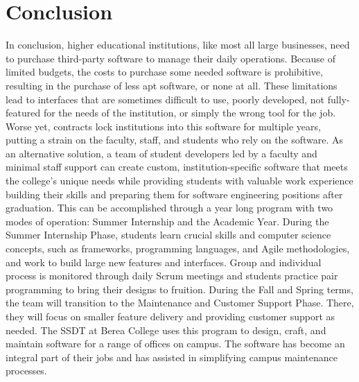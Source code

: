 \section{Conclusion}
In conclusion, higher educational institutions, like most all large businesses, need to purchase third-party software to manage their daily operations. Because of limited budgets, the costs to purchase some needed software is prohibitive, resulting in the purchase of less apt software, or none at all. These limitations lead to interfaces that are sometimes difficult to use, poorly developed, not fully-featured for the needs of the institution, or simply the wrong tool for the job. Worse yet, contracts lock institutions into this software for multiple years, putting a strain on the faculty, staff, and students who rely on the software. As an alternative solution, a team of student developers led by a faculty and minimal staff support can create custom, institution-specific software that meets the college's unique needs while providing students with valuable work experience building their skills and preparing them for software engineering positions after graduation. This can be accomplished through a year long program with two modes of operation: Summer Internship and the Academic Year. During the Summer Internship Phase, students learn crucial skills and computer science concepts, such as frameworks, programming languages, and Agile methodologies, and work to build large new features and interfaces. Group and individual process is monitored through daily Scrum meetings and students practice pair programming to bring their designs to fruition. During the Fall and Spring terms, the team will transition to the Maintenance and Customer Support Phase. There, they will focus on smaller feature delivery and providing customer support as needed. The SSDT at Berea College uses this program to design, craft, and maintain software for a range of offices on campus. The software has become an integral part of their jobs and has assisted in simplifying campus maintenance processes.